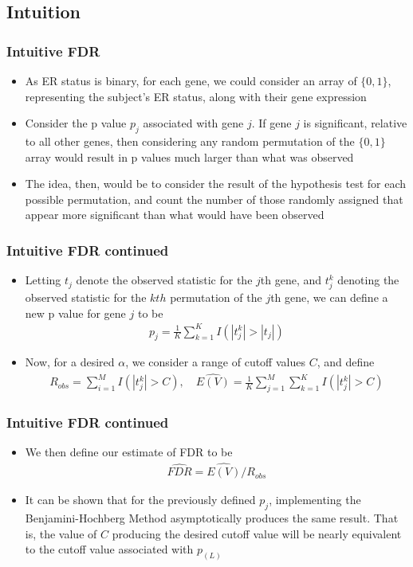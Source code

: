 \documentclass[11pt]{beamer}
\begin{document}
\subsection{Intuition}
\begin{frame}
\frametitle{Intuitive FDR}
{
\begin{itemize}
\item As ER status is binary, for each gene, we could consider an array of  $\{0,1\}$, representing the subject's ER status, along with their gene expression
\item Consider the p value $p_j$ associated with gene $j$. If gene $j$ is significant, relative to all other genes, then considering any random permutation of the $\{0,1\}$ array would result in p values much larger than what was observed \\
\item The idea, then, would be to consider the result of the hypothesis test for each possible permutation, and count the number of those randomly assigned that appear more significant than what would have been observed \\

\end{itemize}
}
\end{frame}

\begin{frame}
\frametitle{Intuitive FDR continued}
\begin{itemize}
\item Letting $t_j$ denote the observed statistic for the $j$th gene, and $t_j^k$ denoting the observed statistic for the $kth$ permutation of the $j$th gene, we can define a new p value for gene $j$ to be 
\begin{align*}
p_j = \frac{1}{K} \sum_{k=1}^K I(|t_j^k| > |t_j|)
\end{align*}
\item Now, for a desired $\alpha$, we consider a range of cutoff values $C$, and define
\begin{align*}
R_{obs} = \sum^M_{i=1} I(|t_j^k| > C), \quad \widehat{E(V)} = \frac{1}{K} \sum_{j=1}^M \sum_{k=1}^K I(|t_j^k| > C)
\end{align*}
\end{itemize}
\end{frame}

\begin{frame}
\frametitle{Intuitive FDR continued}
{
\begin{itemize}
\item We then define our estimate of FDR to be
\begin{align*}
\widehat{FDR} = \widehat{E(V)}/R_{obs}
\end{align*}

\item It can be shown that for the previously defined $p_j$, implementing the Benjamini-Hochberg Method asymptotically produces the same result. That is, the value of $C$ producing the desired cutoff value will be nearly equivalent to the cutoff value associated with $p_{(L)}$ 
\end{itemize}
}
\end{frame}
\end{document}
